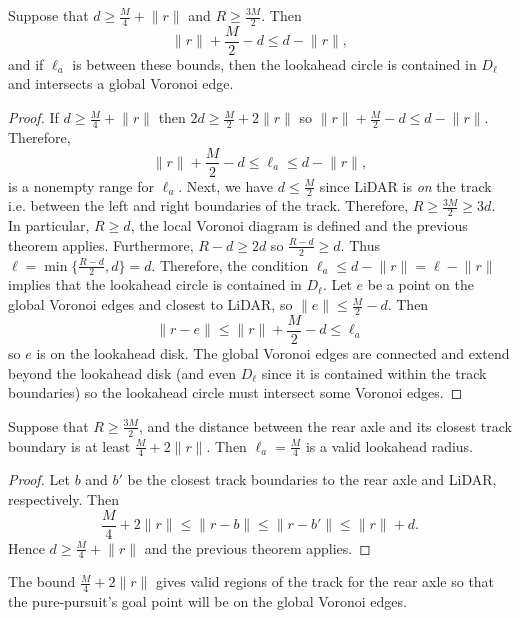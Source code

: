 \begin{theorem}
Suppose that $d \geq \frac{M}{4} + \lVert r \rVert$ and $R \geq \frac{3M}{2}$.
%
Then
$$
\lVert r \rVert + \frac{M}{2} - d 
\leq d - \lVert r \rVert,
$$
and if $\ell_a$ is between these bounds,
then the lookahead circle is contained in $D_\ell$ and intersects a global Voronoi edge.
\end{theorem}

\begin{proof}
If $d \geq \frac{M}{4} + \lVert r \rVert$ then
$ 2d \geq \frac{M}{2} + 2 \lVert r \rVert $
so $ \lVert r \rVert + \frac{M}{2} - d 
\leq d - \lVert r \rVert $.
%
Therefore,
$$
\lVert r \rVert + \frac{M}{2} - d 
\leq \ell_a 
\leq d - \lVert r \rVert,
$$
is a nonempty range for $\ell_a$.
%
Next, we have $d \leq \frac{M}{2}$ since LiDAR is \emph{on} the track i.e. between the left and right boundaries of the track.
%
Therefore, $R \geq \frac{3M}{2} \geq 3d$.
%
In particular, $R \geq d$, the local Voronoi diagram is defined and the previous theorem applies.
%
Furthermore,
$R-d \geq 2d$ so $\frac{R-d}{2} \geq d$.
%
Thus $\ell = \min \{ \frac{R-d}{2}, d \} = d$.
%
Therefore, the condition $\ell_a \leq d - \lVert r \rVert = \ell - \lVert r \rVert$ implies that the lookahead circle is contained in $D_\ell$.
%
Let $e$ be a point on the global Voronoi edges and closest to LiDAR, so $\lVert e \rVert \leq \frac{M}{2} - d$.
Then
$$
\lVert r - e \rVert 
\leq \lVert r \rVert + \frac{M}{2} - d
\leq \ell_a
$$
%
so $e$ is on the lookahead disk.
%
The global Voronoi edges are connected and extend beyond the lookahead disk (and even $D_\ell$ since it is contained within the track boundaries) so the lookahead circle must intersect some Voronoi edges.
\end{proof}


\begin{corollary}
Suppose that $R \geq \frac{3M}{2}$, and the distance between the rear axle and its closest track boundary is at least $\frac{M}{4} + 2\lVert r \rVert$.
%
Then $\ell_a = \frac{M}{4} $ is a valid lookahead radius.
\end{corollary}

\begin{proof}
Let $b$ and $b'$ be the closest track boundaries to the rear axle and LiDAR, respectively.
%
Then
$$
\frac{M}{4} + 2 \lVert r \rVert
\leq \lVert r - b \rVert
\leq \lVert r - b' \rVert
\leq \lVert r \rVert + d.
$$
Hence $d \geq \frac{M}{4} + \lVert r \rVert$ and the previous theorem applies.
\end{proof}

The bound $\frac{M}{4} + 2\lVert r \rVert$ gives valid regions of the track for the rear axle so that the pure-pursuit's goal point will be on the global Voronoi edges.
